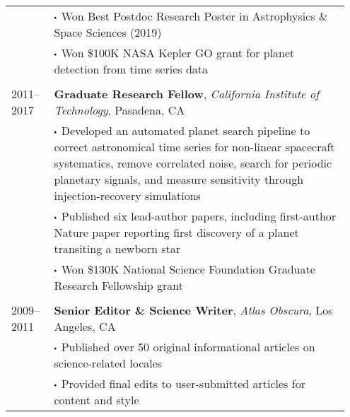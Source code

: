 \begin{tabular}{p{0.12\linewidth} p{0.83\linewidth}}
& $\sbullet$ Won Best Postdoc Research Poster in Astrophysics \& Space Sciences (2019) \\
& $\sbullet$ Won \$100K NASA Kepler GO grant for planet detection from time series data \\
\\
2011--2017 & \textbf{Graduate Research Fellow}, \textit{California Institute of Technology}, Pasadena, CA\\
& $\sbullet$ Developed an automated planet search pipeline to correct astronomical time series for non-linear spacecraft systematics, remove correlated noise, search for periodic planetary signals, and measure sensitivity through injection-recovery simulations \\ 
& $\sbullet$ Published six lead-author papers, including first-author Nature paper reporting first discovery of a planet transiting a newborn star \\
& $\sbullet$ Won \$130K National Science Foundation Graduate Research Fellowship grant \\
\\
2009--2011 & \textbf{Senior Editor \& Science Writer}, \textit{Atlas Obscura}, Los Angeles, CA\\
& $\sbullet$ Published over 50 original informational articles on science-related locales\\
& $\sbullet$ Provided final edits to user-submitted articles for content and style\\
\end{tabular}
\fi 